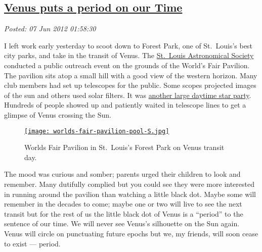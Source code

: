 %

\subsection*{\href{http://bakerjd99.wordpress.com/2012/06/06/venus-puts-a-period-on-our-time/}{Venus puts a period on our Time}}


\noindent\emph{Posted: 07 Jun 2012 01:58:30}
\vspace{6pt}

I left work early yesterday to scoot down to Forest Park, one of St.\
Louis's best city parks, and take in the transit of Venus. The
\href{http://www.slasonline.org/}{St.\ Louis Astronomical Society}
conducted a public outreach event on the grounds of the World's Fair
Pavilion. The pavilion sits atop a small hill with a good view of the
western horizon. Many club members had set up telescopes for the public.
Some scopes projected images of the sun and others used solar filters.
It was
\href{http://bakerjd99.wordpress.com/2012/05/22/the-wahweap-wow/}{another
large daytime star party}. Hundreds of people showed up and patiently
waited in telescope lines to get a glimpse of Venus crossing the Sun.



\captionsetup[figure]{labelformat=empty}
\begin{figure}[htbp]
\centering
\href{http://conceptcontrol.smugmug.com/Places/USA-and-Canada/Missouri-Moments/14124438\_8dvZ6h}{\texttt{[image: worlds-fair-pavilion-pool-S.jpg]}}
\caption{Worlds Fair Pavilion in St.\ Louis's Forest Park on Venus transit day.}
\label{fig:2910X0}
\end{figure}


The mood was curious and somber; parents urged their children to look
and remember. Many dutifully complied but you could see they were more
interested in running around the pavilion than watching a little black
dot. Maybe some will remember in the decades to come; maybe one or two
will live to see the next transit but for the rest of us the little
black dot of Venus is a ``period'' to the sentence of our time. We will
never see Venus's silhouette on the Sun again. Venus will circle on
punctuating future epochs but we, my friends, will soon cease to exist
--- period.


